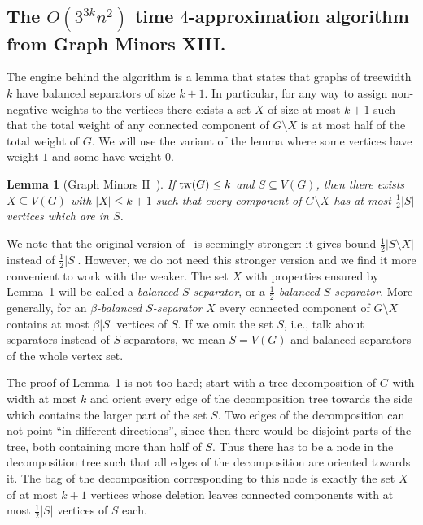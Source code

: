 \documentclass[a4paper,11pt]{article}
\newtheorem{lemma}{Lemma}[section]
\theoremstyle{definition}
\theoremstyle{remark}
\begin{document}
\subsection{The $O(3^{3k}n^2)$ time $4$-approximation algorithm from
  Graph Minors XIII.}\label{sec:nSquareAppx}
The engine behind the algorithm is a lemma that states that graphs of
treewidth $k$ have balanced separators of size $k+1$.
In particular, for any way to assign non-negative weights to the
vertices there exists a set $X$ of size at most $k+1$ such that the
total weight of any connected component of $G \setminus X$ is at most
half of the total weight of $G$.  We will use the variant of the lemma
where some vertices have weight $1$ and some have weight $0$.

\begin{lemma}[Graph Minors II~\cite{RobertsonS2}]
  \label{lemma:halfhalf}
  If $\mathrm{tw}(G)\leq k$ and $S \subseteq V(G)$, then there exists $X \subseteq V(G)$ with
  $|X| \leq k+1$ such that every component of $G \setminus X$ has at
  most $\frac{1}{2}|S|$ vertices which are in $S$.
\end{lemma}

We note that the original version of~\cite{RobertsonS2} is seemingly
stronger: it gives bound $\frac{1}{2}|S\setminus X|$ instead of
$\frac{1}{2}|S|$.  However, we do not need this stronger version and
we find it more convenient to work with the weaker.  The set $X$ with
properties ensured by Lemma~\ref{lemma:halfhalf} will be called a
{\emph{balanced $S$-separator}}, or a {\emph{$\frac{1}{2}$-balanced
    $S$-separator}}.  More generally, for an {\emph{$\beta$-balanced
    $S$-separator}} $X$ every connected component of $G\setminus X$
contains at most $\beta|S|$ vertices of $S$.  If we omit the set $S$,
i.e., talk about separators instead of $S$-separators, we mean
$S=V(G)$ and balanced separators of the whole vertex set.

The proof of Lemma~\ref{lemma:halfhalf} is not too hard; start with a
tree decomposition of $G$ with width at most $k$ and orient every edge
of the decomposition tree towards the side which contains the larger
part of the set $S$.  Two edges of the decomposition can not point
``in different directions'', since then there would be disjoint parts
of the tree, both containing more than half of $S$.  Thus there has to
be a node in the decomposition tree such that all edges of the
decomposition are oriented towards it.  The bag of the decomposition
corresponding to this node is exactly the set $X$ of at most $k+1$
vertices whose deletion leaves connected components with at most
$\frac{1}{2}|S|$ vertices of $S$ each.
\end{document}

